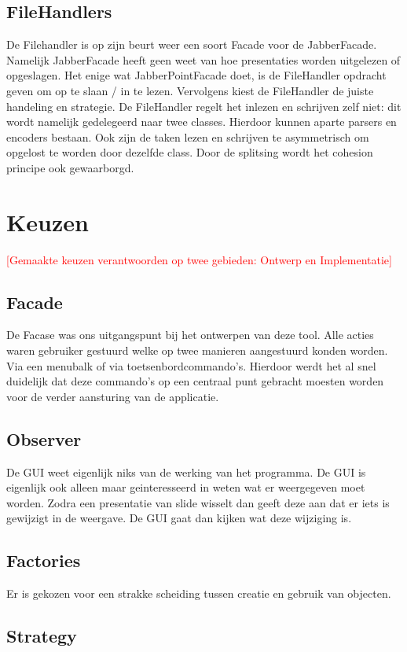 \documentclass[a4paper]{article}
\newcommand{\todo}[1]{\textcolor{red}{[#1]}}
\newcommand{\1}[0]{\'{e}\'{e}n}
\begin{document}
\subsection{FileHandlers}
De Filehandler is op zijn beurt weer een soort Facade voor de JabberFacade.
Namelijk JabberFacade heeft geen weet van hoe presentaties worden uitgelezen of
opgeslagen. Het enige wat JabberPointFacade doet, is de FileHandler opdracht geven om op te slaan / in te lezen. Vervolgens kiest de FileHandler de juiste handeling en strategie. De FileHandler regelt het inlezen en schrijven zelf niet: dit wordt namelijk gedelegeerd naar twee classes. Hierdoor kunnen aparte parsers en encoders bestaan. Ook zijn de taken lezen en schrijven te asymmetrisch om opgelost te worden door dezelfde class. Door de splitsing wordt het cohesion principe ook gewaarborgd.

\section{Keuzen}
\label{sec:keuzen}
\todo{Gemaakte keuzen verantwoorden op twee gebieden: Ontwerp en Implementatie}
\subsection{Facade}
De Facase was ons uitgangspunt bij het ontwerpen van deze tool. Alle acties
waren gebruiker gestuurd welke op twee manieren aangestuurd konden worden. Via
een menubalk of via toetsenbordcommando's. Hierdoor werdt het al snel duidelijk
dat deze commando's op een centraal punt gebracht moesten worden voor de verder
aansturing van de applicatie.

\subsection{Observer}
De GUI weet eigenlijk niks van de werking van het programma. De GUI is eigenlijk
ook alleen maar geinteresseerd in weten wat er weergegeven moet worden. Zodra
een presentatie van slide wisselt dan geeft deze aan dat er iets is gewijzigt in
de weergave. De GUI gaat dan kijken wat deze wijziging is.

\subsection{Factories}
Er is gekozen voor een strakke scheiding tussen creatie en gebruik van objecten.

\subsection{Strategy}
\end{document}

